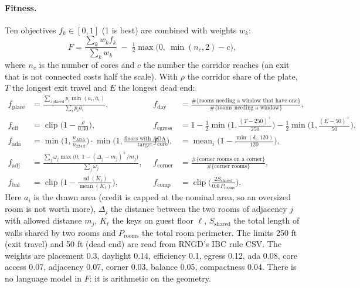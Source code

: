 \paragraph{Fitness.} Ten objectives $f_k \in [0,1]$ (1 is best) are combined with weights $w_k$:
\[ F = \frac{\sum_k w_k f_k}{\sum_k w_k} \; - \; \tfrac12 \max\!\big(0,\ \min(n_c, 2) - c\big), \]
where $n_c$ is the number of cores and $c$ the number the corridor reaches (an exit that is not connected costs half the
scale). With $\rho$ the corridor share of the plate, $T$ the longest exit travel and $E$ the longest dead end:
\begingroup\small\begin{align*}
f_{\text{place}} &= \frac{\sum_{i\ \text{placed}} p_i \min(a_i, \bar a_i)}{\sum_{i} p_i \bar a_i}, &
f_{\text{day}} &= \frac{\#\{\text{rooms needing a window that have one}\}}{\#\{\text{rooms needing a window}\}}, \\
f_{\text{eff}} &= \operatorname{clip}\!\Big(1 - \frac{\rho}{0.30}\Big), &
f_{\text{egress}} &= 1 - \tfrac12 \min\!\Big(1, \frac{(T - 250)^+}{250}\Big) - \tfrac12 \min\!\Big(1, \frac{(E - 50)^+}{50}\Big), \\
f_{\text{ada}} &= \min\!\Big(1, \frac{n_{\text{ADA}}}{n_{224.2}}\Big)\cdot\min\!\Big(1, \frac{\text{floors with ADA}}{\text{target}}\Big), &
f_{\text{core}} &= \operatorname{mean}_i \Big(1 - \frac{\min(\delta_i, 120)}{120}\Big), \\
f_{\text{adj}} &= \frac{\sum_j \omega_j \max\big(0,\ 1 - (\Delta_j - m_j)^+/m_j\big)}{\sum_j \omega_j}, &
f_{\text{corner}} &= \frac{\#\{\text{corner rooms on a corner}\}}{\#\{\text{corner rooms}\}}, \\
f_{\text{bal}} &= \operatorname{clip}\!\Big(1 - \frac{\operatorname{sd}(K_\ell)}{\operatorname{mean}(K_\ell)}\Big), &
f_{\text{comp}} &= \operatorname{clip}\!\Big(\frac{2 S_{\text{shared}}}{0.6\, P_{\text{rooms}}}\Big).
\end{align*}\endgroup
Here $a_i$ is the drawn area (credit is capped at the nominal area, so an oversized room is not worth more),
$\Delta_j$ the distance between the two rooms of adjacency $j$ with allowed distance $m_j$, $K_\ell$ the keys on guest floor
$\ell$, $S_{\text{shared}}$ the total length of walls shared by two rooms and $P_{\text{rooms}}$ the total room perimeter.
The limits 250 ft (exit travel) and 50 ft (dead end) are read from RNGD's IBC rule CSV. The weights are
placement 0.3, daylight 0.14, efficiency 0.1, egress 0.12, ada 0.08, core access 0.07, adjacency 0.07, corner 0.03, balance 0.05, compactness 0.04. There is no language model in $F$: it is arithmetic on the geometry.

